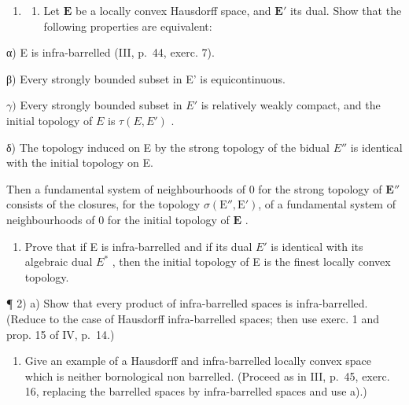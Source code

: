 \exercisegroup

\begin{enumerate}
\def\labelenumi{\arabic{enumi})}
\tightlist
\item
  \begin{enumerate}
  \def\labelenumii{\alph{enumii})}
  \tightlist
  \item
    Let \(\mathbf{E}\) be a locally convex Hausdorff space, and \(\mathbf{E}'\) its dual. Show that the following properties are equivalent:
  \end{enumerate}
\end{enumerate}

α) E is infra-barrelled (III, p.~44, exerc. 7).

β) Every strongly bounded subset in E' is equicontinuous.

\(\gamma)\) Every strongly bounded subset in \(E'\) is relatively weakly compact, and the initial topology of \(E\) is \(\tau(E, E')\) .

δ) The topology induced on E by the strong topology of the bidual \(E''\) is identical with the initial topology on E.

Then a fundamental system of neighbourhoods of 0 for the strong topology of \(\mathbf{E}''\) consists of the closures, for the topology \(\sigma (\mathrm{E}'', \mathrm{E}')\), of a fundamental system of neighbourhoods of 0 for the initial topology of \(\mathbf{E}\) .

\begin{enumerate}
\def\labelenumi{\alph{enumi})}
\setcounter{enumi}{1}
\tightlist
\item
  Prove that if E is infra-barrelled and if its dual \(E'\) is identical with its algebraic dual \(E^{*}\) , then the initial topology of E is the finest locally convex topology.
\end{enumerate}

¶ 2) a) Show that every product of infra-barrelled spaces is infra-barrelled. (Reduce to the case of Hausdorff infra-barrelled spaces; then use exerc. 1 and prop. 15 of IV, p.~14.)

\begin{enumerate}
\def\labelenumi{\alph{enumi})}
\setcounter{enumi}{1}
\tightlist
\item
  Give an example of a Hausdorff and infra-barrelled locally convex space which is neither bornological non barrelled. (Proceed as in III, p.~45, exerc. 16, replacing the barrelled spaces by infra-barrelled spaces and use a).)
\end{enumerate}

